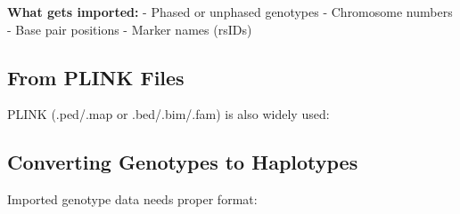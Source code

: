 \documentclass[
  letterpaper,
]{book}
\newenvironment{Shaded}{\begin{snugshade}}{\end{snugshade}}
\newcommand{\AttributeTok}[1]{\textcolor[rgb]{0.40,0.45,0.13}{#1}}
\newcommand{\CommentTok}[1]{\textcolor[rgb]{0.37,0.37,0.37}{#1}}
\newcommand{\DecValTok}[1]{\textcolor[rgb]{0.68,0.00,0.00}{#1}}
\newcommand{\FunctionTok}[1]{\textcolor[rgb]{0.28,0.35,0.67}{#1}}
\newcommand{\NormalTok}[1]{\textcolor[rgb]{0.00,0.23,0.31}{#1}}
\newcommand{\OtherTok}[1]{\textcolor[rgb]{0.00,0.23,0.31}{#1}}
\newcommand{\SpecialCharTok}[1]{\textcolor[rgb]{0.37,0.37,0.37}{#1}}
\newcommand{\StringTok}[1]{\textcolor[rgb]{0.13,0.47,0.30}{#1}}
\begin{document}
\textbf{What gets imported:} - Phased or unphased genotypes - Chromosome
numbers - Base pair positions - Marker names (rsIDs)

\subsection{From PLINK Files}\label{from-plink-files}

PLINK (.ped/.map or .bed/.bim/.fam) is also widely used:

\begin{Shaded}
\end{Shaded}

\subsection{Converting Genotypes to
Haplotypes}\label{converting-genotypes-to-haplotypes}

Imported genotype data needs proper format:
\end{document}
